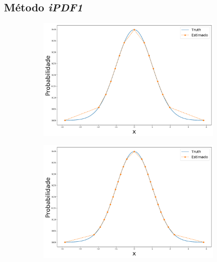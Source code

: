 \subsection{Método \textit{iPDF1}}

\begin{figure}[H]
	\centering
	\begin{subfigure}[b]{0.45\textwidth}
		\centering 
		\includegraphics[width=\linewidth]{./figuras/iPDF1_normal_15}
		\caption{}
		\label{fig:ipdfnorm15}
	\end{subfigure}
	\hfill
	\begin{subfigure}[b]{0.45\textwidth}
		\centering 
		\includegraphics[width=\linewidth]{./figuras/iPDF1_normal_25}
		\caption{}
		\label{fig:ipdfnorm25}
	\end{subfigure}


\end{figure}
